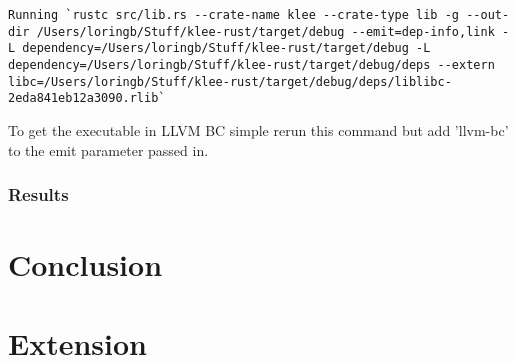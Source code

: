 \documentclass{report}
\begin{document}
\begin{lstlisting}
Running `rustc src/lib.rs --crate-name klee --crate-type lib -g --out-dir /Users/loringb/Stuff/klee-rust/target/debug --emit=dep-info,link -L dependency=/Users/loringb/Stuff/klee-rust/target/debug -L dependency=/Users/loringb/Stuff/klee-rust/target/debug/deps --extern libc=/Users/loringb/Stuff/klee-rust/target/debug/deps/liblibc-2eda841eb12a3090.rlib`
\end{lstlisting}

To get the executable in LLVM BC simple rerun this command but add 'llvm-bc' to the emit parameter passed in.

\subsection{Results}

\chapter {Conclusion}

\chapter {Extension}
\end{document}
